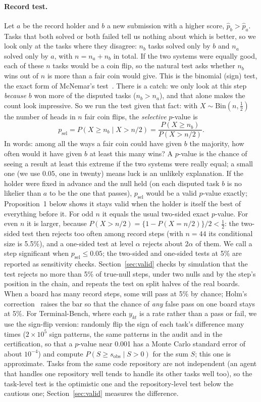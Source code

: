 \documentclass[11pt]{article}
\renewcommand{\hat}{\widehat}
\begin{document}
\paragraph{Record test.}
Let $a$ be the record holder and $b$ a new submission with a higher score, $\hat p_b>\hat p_a$.
Tasks that both solved or both failed tell us nothing about which is better, so we look only at the tasks where they disagree: $n_b$ tasks solved only by $b$ and $n_a$ solved only by $a$, with $n=n_a+n_b$ in total.
If the two systems were equally good, each of these $n$ tasks would be a coin flip, so the natural test asks whether $n_b$ wins out of $n$ is more than a fair coin would give.
This is the binomial (sign) test, the exact form of McNemar's test~\citep{mcnemar1947}.
There is a catch: we only look at this step \emph{because} $b$ won more of the disputed tasks ($n_b>n_a$), and that alone makes the count look impressive.
So we run the test given that fact: with $X\sim\mathrm{Bin}(n,\tfrac12)$ the number of heads in $n$ fair coin flips, the \emph{selective} $p$-value is
\[p_{\mathrm{sel}}=P(X\ge n_b\mid X>n/2)=\frac{P(X\ge n_b)}{P(X>n/2)}.\]
In words: among all the ways a fair coin could have given $b$ the majority, how often would it have given $b$ at least this many wins?
A $p$-value is the chance of seeing a result at least this extreme if the two systems were really equal; a small one (we use $0.05$, one in twenty) means luck is an unlikely explanation.
If the holder were fixed in advance and the null held (on each disputed task $b$ is no likelier than $a$ to be the one that passes), $p_{\mathrm{sel}}$ would be a valid $p$-value exactly; Proposition~1 below shows it stays valid when the holder is itself the best of everything before it.
For odd $n$ it equals the usual two-sided exact $p$-value.
For even $n$ it is larger, because $P(X>n/2)=\{1-P(X=n/2)\}/2<\tfrac12$: the two-sided test then rejects too often among record steps (with $n=44$ its conditional size is 5.5\%), and a one-sided test at level $\alpha$ rejects about $2\alpha$ of them.
We call a step significant when $p_{\mathrm{sel}}\le0.05$; the two-sided and one-sided tests at 5\% are reported as sensitivity checks.
Section~\ref{sec:valid} checks by simulation that the test rejects no more than 5\% of true-null steps, under two nulls and by the step's position in the chain, and repeats the test on split halves of the real boards.
When a board has many record steps, some will pass at 5\% by chance; Holm's correction~\citep{holm1979} raises the bar so that the chance of \emph{any} false pass on one board stays at 5\%.
For Terminal-Bench, where each $y_{kt}$ is a rate rather than a pass or fail, we use the sign-flip version: randomly flip the sign of each task's difference many times ($2\times10^5$ sign patterns, the same patterns in the audit and in the certification, so that a $p$-value near 0.001 has a Monte Carlo standard error of about $10^{-4}$) and compute $P(S\ge s_{\mathrm{obs}}\mid S>0)$ for the sum $S$; this one is approximate.
Tasks from the same code repository are not independent (an agent that handles one repository well tends to handle its other tasks well too), so the task-level test is the optimistic one and the repository-level test below the cautious one; Section~\ref{sec:valid} measures the difference.
\end{document}
